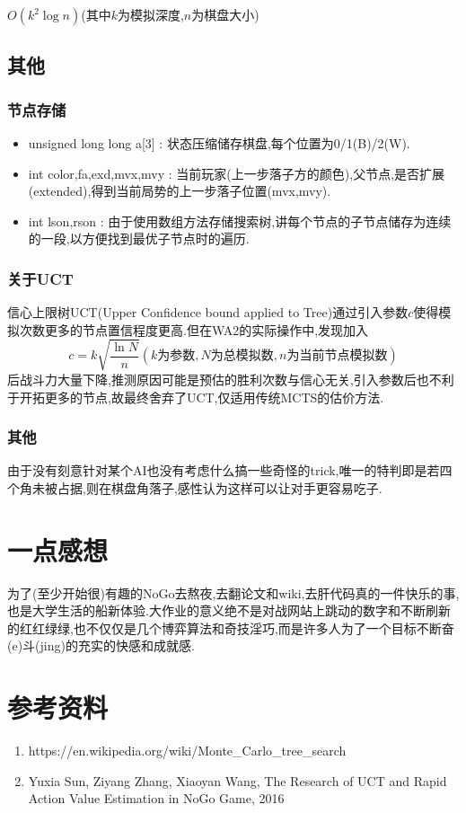 \documentclass[UTF8]{article}
\newcommand{\fr}[2]{\dfrac{#1}{#2}}
\theoremstyle{definition}
\begin{document}
$O(k^2 \log n)$(其中$k$为模拟深度,$n$为棋盘大小)

\subsection{其他}

\subsubsection{节点存储}

\begin{itemize}
	\item unsigned long long a[3] : 状态压缩储存棋盘,每个位置为0/1(B)/2(W).
	\item int color,fa,exd,mvx,mvy : 当前玩家(上一步落子方的颜色),父节点,是否扩展(extended),得到当前局势的上一步落子位置(mvx,mvy).
	\item int lson,rson : 由于使用数组方法存储搜索树,讲每个节点的子节点储存为连续的一段,以方便找到最优子节点时的遍历.
\end{itemize}

\subsubsection{关于UCT}

信心上限树UCT(Upper Confidence bound applied to Tree)通过引入参数$c$使得模拟次数更多的节点置信程度更高.但在WA2的实际操作中,发现加入$$ c = k \sqrt{\fr{\ln N}{n}} (k为\mbox{参数},N\mbox{为总模拟数},n\mbox{为当前节点模拟数}) $$后战斗力大量下降,推测原因可能是预估的胜利次数与信心无关,引入参数后也不利于开拓更多的节点,故最终舍弃了UCT,仅适用传统MCTS的估价方法.

\subsubsection{其他}

由于没有刻意针对某个AI也没有考虑什么搞一些奇怪的trick,唯一的特判即是若四个角未被占据,则在棋盘角落子,感性认为这样可以让对手更容易吃子.

\section{一点感想}

为了(至少开始很)有趣的NoGo去熬夜,去翻论文和wiki,去肝代码真的一件快乐的事,也是大学生活的船新体验.大作业的意义绝不是对战网站上跳动的数字和不断刷新的红红绿绿,也不仅仅是几个博弈算法和奇技淫巧,而是许多人为了一个目标不断奋(e)斗(jing)的充实的快感和成就感.

\section{参考资料}

\begin{enumerate}
	\item https://en.wikipedia.org/wiki/Monte\_Carlo\_tree\_search
	\item Yuxia Sun, Ziyang Zhang, Xiaoyan Wang, The Research of UCT and Rapid Action Value Estimation in NoGo Game, 2016
\end{enumerate}
\end{document}
